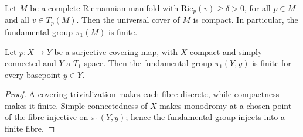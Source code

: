 \begin{corollary}
  \label{cor:dc-ch9-3-2}
  Let $M$ be a complete Riemannian manifold with $\mathrm{Ric}_p(v)\ge\delta>0$, for
  all $p\in M$ and all $v\in T_p(M)$. Then the universal cover of $M$ is compact. In
  particular, the fundamental group $\pi_1(M)$ is finite.
\end{corollary}

\begin{lemma}
  \label{lem:dc-ch9-3-2-compact-cover}


  Let $p:X\to Y$ be a surjective covering map, with $X$ compact and simply connected and
  $Y$ a $T_1$ space.  Then the fundamental group $\pi_1(Y,y)$ is finite for every basepoint
  $y\in Y$.
\end{lemma}
\begin{proof}

  A covering trivialization makes each fibre discrete, while compactness makes it finite.
  Simple connectedness of $X$ makes monodromy at a chosen point of the fibre injective on
  $\pi_1(Y,y)$; hence the fundamental group injects into a finite fibre.
\end{proof}


